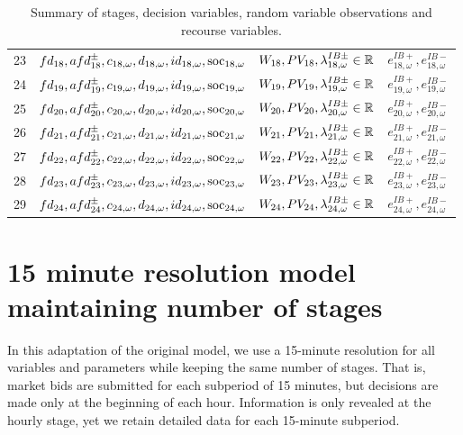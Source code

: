 \begin{table}[H]
\begin{tabular}{c c c c}
	23& $fd_{18}, afd^{\pm}_{18}, c_{18, \omega}, d_{18, \omega}, id_{18, \omega}, \text{soc}_{18, \omega}$ & $W_{18}, PV_{18}, \lambda^{IB\pm}_{18, \omega} \in \mathbb{R}$ &  $e^{IB+}_{18, \omega}, e^{IB-}_{18, \omega}$\\
	24& $fd_{19}, afd^{\pm}_{19}, c_{19, \omega}, d_{19, \omega}, id_{19, \omega}, \text{soc}_{19, \omega}$ & $W_{19}, PV_{19}, \lambda^{IB\pm}_{19, \omega} \in \mathbb{R}$ & $e^{IB+}_{19, \omega}, e^{IB-}_{19, \omega}$\\
	25& $fd_{20}, afd^{\pm}_{20}, c_{20, \omega}, d_{20, \omega}, id_{20, \omega}, \text{soc}_{20, \omega}$  & $W_{20}, PV_{20}, \lambda^{IB\pm}_{20, \omega} \in \mathbb{R}$ & $e^{IB+}_{20, \omega}, e^{IB-}_{20, \omega}$\\
	26&  $fd_{21}, afd^{\pm}_{21}, c_{21, \omega}, d_{21, \omega}, id_{21, \omega}, \text{soc}_{21, \omega}$ & $W_{21}, PV_{21}, \lambda^{IB\pm}_{21, \omega} \in \mathbb{R}$ & $e^{IB+}_{21, \omega}, e^{IB-}_{21, \omega}$\\
	27& $fd_{22}, afd^{\pm}_{22}, c_{22, \omega}, d_{22, \omega}, id_{22, \omega}, \text{soc}_{22, \omega}$ & $W_{22}, PV_{22}, \lambda^{IB\pm}_{22, \omega} \in \mathbb{R}$ & $e^{IB+}_{22, \omega}, e^{IB-}_{22, \omega}$\\
	28& $fd_{23}, afd^{\pm}_{23}, c_{23, \omega}, d_{23, \omega}, id_{23, \omega}, \text{soc}_{23, \omega}$ & $W_{23}, PV_{23}, \lambda^{IB\pm}_{23, \omega} \in \mathbb{R}$ & $e^{IB+}_{23, \omega}, e^{IB-}_{23, \omega}$\\
	29& $fd_{24}, afd^{\pm}_{24}, c_{24, \omega}, d_{24, \omega}, id_{24, \omega}, \text{soc}_{24, \omega}$ & $W_{24}, PV_{24}, \lambda^{IB\pm}_{24, \omega} \in \mathbb{R}$ & $e^{IB+}_{24, \omega}, e^{IB-}_{24, \omega}$\\
		
	
\end{tabular}
\caption{Summary of stages, decision variables, random variable observations and recourse variables.}
\label{TABLE:stages-rv-dv}
\end{table}

\section{15 minute resolution model maintaining number of stages}

In this adaptation of the original model, we use a 15-minute resolution for all variables and parameters while keeping the same number of stages. That is, market bids are submitted for each subperiod of 15 minutes, but decisions are made only at the beginning of each hour. Information is only revealed at the hourly stage, yet we retain detailed data for each 15-minute subperiod.

